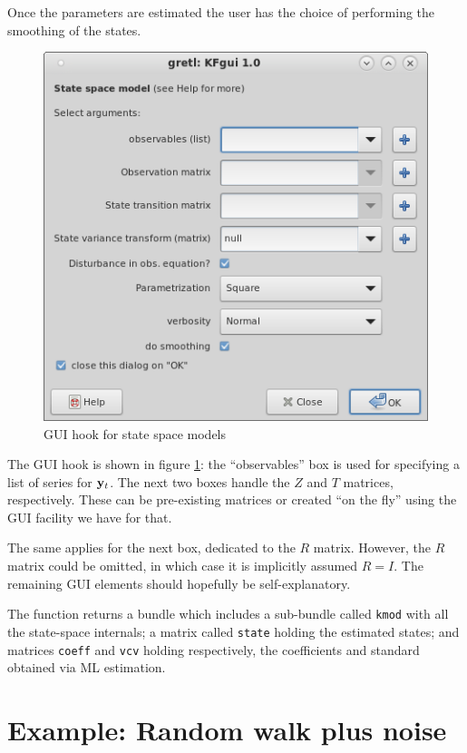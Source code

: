\documentclass[a4paper]{article}
\newcommand{\obs}{\ensuremath\mathbf{y}_t}
\begin{document}
Once the parameters are estimated the user has the choice of
performing the smoothing of the states.

\begin{figure}[htbp]
  \centering
  \includegraphics[scale=0.5]{GUIScreenshot.png}
  \caption{GUI hook for state space models}
  \label{fig:GUI}
\end{figure}

The GUI hook is shown in figure \ref{fig:GUI}: the ``observables'' box
is used for specifying a list of series for $\obs$. The next two boxes
handle the $Z$ and $T$ matrices, respectively. These can be
pre-existing matrices or created ``on the fly'' using the GUI facility
we have for that. 

The same applies for the next box, dedicated to the $R$
matrix. However, the $R$ matrix could be omitted, in which case it is
implicitly assumed $R = I$.  The remaining GUI elements should
hopefully be self-explanatory.

The function returns a bundle which includes a sub-bundle called
\texttt{kmod} with all the state-space internals; a matrix called
\texttt{state} holding the estimated states; and matrices
\texttt{coeff} and \texttt{vcv} holding respectively, the coefficients
and standard obtained via ML estimation.

\section*{Example: Random walk plus noise}
\end{document}
